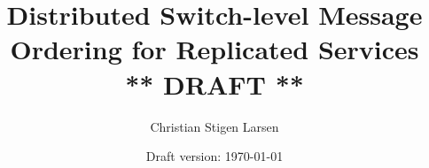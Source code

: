 \documentclass[a4paper,twoside]{report}
\begin{document}
  \author{Christian Stigen Larsen}
  \date{Draft version: \today}
  \title{Distributed Switch-level Message Ordering for Replicated Services
    \\\textsf{** DRAFT **}}

  \maketitle
  
  

  \listoftodos %
  \listoftables
  \listoffigures
  \listofalgorithms{}
  \lstlistoflistings{}

  \tableofcontents

  

  
  
  
  
  
  
  
  

  
  

  \appendix
    

  \clearpage %
  \printindex
  
\end{document}
